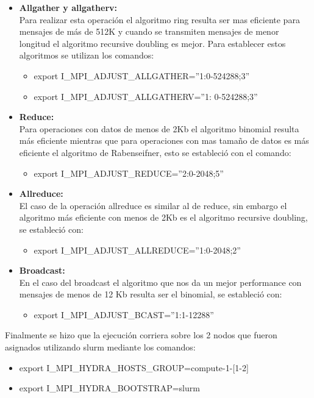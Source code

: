 \begin{itemize}
    \item \textbf{Allgather y allgatherv:}\\
    Para realizar esta operación el algoritmo ring resulta ser mas eficiente para mensajes de más de 512K y cuando se transmiten mensajes de menor longitud el algoritmo recursive doubling es mejor. Para establecer estos algoritmos se utilizan los comandos:\\
    \begin{itemize}
        \item export I\_MPI\_ADJUST\_ALLGATHER=”1:0-524288;3”
        \item export I\_MPI\_ADJUST\_ALLGATHERV=”1: 0-524288;3”
    \end{itemize}
    \item \textbf{Reduce:}\\
    Para operaciones con datos de menos de 2Kb el algoritmo binomial resulta más eficiente mientras que para operaciones con mas tamaño de datos es más eficiente el algoritmo de Rabenseifner, esto se estableció con el comando:
    \begin{itemize}
        \item export I\_MPI\_ADJUST\_REDUCE=”2:0-2048;5”
    \end{itemize}
    \item \textbf{Allreduce:}\\
    El caso de la operación allreduce es similar al de reduce, sin embargo el algoritmo más eficiente con menos de 2Kb es el algoritmo recursive doubling, se estableció con:
    \begin{itemize}
        \item export I\_MPI\_ADJUST\_ALLREDUCE=”1:0-2048;2”
    \end{itemize}
    \item \textbf{Broadcast:}\\
    En el caso del broadcast el algoritmo que nos da un mejor performance con mensajes de menos de 12 Kb resulta ser el binomial, se estableció con:
    \begin{itemize}
        \item export I\_MPI\_ADJUST\_BCAST=”1:1-12288”
    \end{itemize}
\end{itemize}

Finalmente se hizo que la ejecución corriera sobre los 2 nodos que fueron asignados utilizando slurm mediante los comandos:
\begin{itemize}
    \item export I\_MPI\_HYDRA\_HOSTS\_GROUP=compute-1-[1-2]
    \item export I\_MPI\_HYDRA\_BOOTSTRAP=slurm
\end{itemize}

